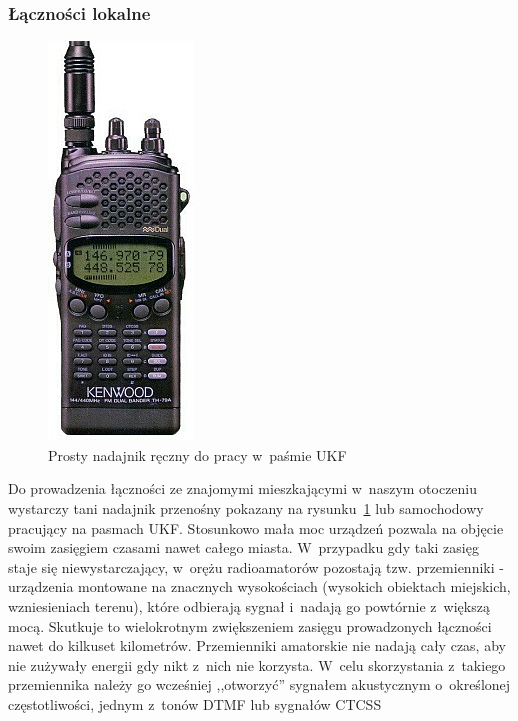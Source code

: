 \documentclass[eng,oneside]{mgr}
\begin{document}
				\subsubsection{Łączności lokalne}
			\begin{figure}
				\vspace{-20pt}
				\begin{center}
					\includegraphics[scale=0.5]{ukf_handheld}
				\end{center}
				\vspace{-20pt}
				\caption{Prosty nadajnik ręczny do pracy w~paśmie UKF}
				\vspace{-20pt}
				\label{fig:ukf_handheld}
			\end{figure}
				Do prowadzenia łączności ze znajomymi mieszkającymi w~naszym otoczeniu wystarczy tani nadajnik przenośny pokazany na rysunku~\ref{fig:ukf_handheld} lub samochodowy pracujący na pasmach UKF. Stosunkowo mała moc urządzeń pozwala na objęcie swoim zasięgiem czasami nawet całego miasta. W~przypadku gdy taki zasięg staje się niewystarczający, w~orężu radioamatorów pozostają tzw. przemienniki - urządzenia montowane na znacznych wysokościach (wysokich obiektach miejskich, wzniesieniach terenu), które odbierają sygnał i~nadają go powtórnie z~większą mocą. Skutkuje to wielokrotnym zwiększeniem zasięgu prowadzonych łączności nawet do kilkuset kilometrów. Przemienniki amatorskie nie nadają cały czas, aby nie zużywały energii gdy nikt z~nich nie korzysta. W~celu skorzystania z~takiego przemiennika należy go wcześniej ,,otworzyć'' sygnałem akustycznym o~określonej częstotliwości, jednym z~tonów DTMF lub sygnałów CTCSS
\end{document}
